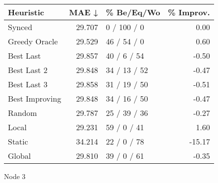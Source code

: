 \begin{tabular}{lrlr}
\toprule
\textbf{Heuristic} & \textbf{MAE ↓} & \textbf{\% Be/Eq/Wo} & \textbf{\% Improv.} \\
\midrule
            Synced &         29.707 &          0 / 100 / 0 &                0.00 \\
     Greedy Oracle &         29.529 &          46 / 54 / 0 &                0.60 \\
         Best Last &         29.857 &          40 / 6 / 54 &               -0.50 \\
       Best Last 2 &         29.848 &         34 / 13 / 52 &               -0.47 \\
       Best Last 3 &         29.858 &         31 / 19 / 50 &               -0.51 \\
    Best Improving &         29.848 &         34 / 16 / 50 &               -0.47 \\
            Random &         29.787 &         25 / 39 / 36 &               -0.27 \\
             Local &         29.231 &          59 / 0 / 41 &                1.60 \\
            Static &         34.214 &          22 / 0 / 78 &              -15.17 \\
            Global &         29.810 &          39 / 0 / 61 &               -0.35 \\
\bottomrule
\end{tabular}
\caption{Node 3}
\label{tab:non_lr01_le2_bs4_3}
